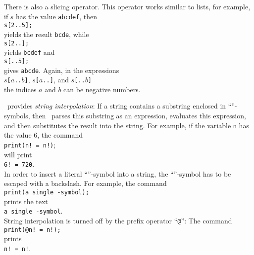 There is also a slicing operator.  This operator works similar to lists, for example, if $s$ has the value 
\texttt{abcdef}, then 
\\[0.2cm]
\hspace*{1.3cm}
\texttt{s[2..5];}
\\[0.2cm]
yields the result \texttt{bcde}, while 
\\[0.2cm]
\hspace*{1.3cm}
\texttt{s[2..];}
\\[0.2cm]
yields \texttt{bcdef} and 
\\[0.2cm]
\hspace*{1.3cm}
\texttt{s[..5];}
\\[0.2cm]
gives \texttt{abcde}.  Again, in the expressions
\\[0.2cm]
\hspace*{1.3cm}
\texttt{$s$[$a$..$b$]}, \quad \texttt{$s$[$a$..]}, \quad and \quad \texttt{$s$[..$b$]}
\\[0.2cm]
the indices $a$ and $b$ can be negative numbers.

\setlx\ provides \emph{string interpolation}:
If a string contains a substring enclosed in ``\texttt{}''-symbols, then \setlx\ 
parses this substring as an expression, evaluates this expression, and then substitutes the result
into the string.  For example, if the variable \texttt{n} has the value $6$, the command
\\[0.2cm]
\hspace*{1.3cm}
\texttt{print(n! = n!)};
\\[0.2cm]
will print
\\[0.2cm]
\hspace*{1.3cm}
\texttt{6! = 720}.
\\[0.2cm]
In order to insert a literal ``\texttt{}''-symbol into a string,  the
``\texttt{\symbol{36}}''-symbol has to be escaped with a backslash.  For example, the command
\\[0.2cm]
\hspace*{1.3cm}
\texttt{print(a single -symbol);}
\\[0.2cm]
prints the text
\\[0.2cm]
\hspace*{1.3cm}
\texttt{a single -symbol}.
\\[0.2cm]
String interpolation is turned off by the prefix operator ``\texttt{@}'':
The command
\\[0.2cm]
\hspace*{1.3cm}
\texttt{print(@n! = n!);}
\\[0.2cm]
prints
\\[0.2cm]
\hspace*{1.3cm}
\texttt{n! = n!}.

